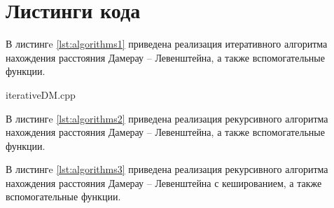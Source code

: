 \section{Листинги кода}

В листингe \ref{lst:algorithms1} приведена реализация итеративного алгоритма нахождения расстояния Дамерау -- Левенштейна, а также вспомогательные функции.

%
\begin{lstinputlisting}[
	caption={Итеративный алгоритм},
	label={lst:algorithms1}
	]{iterativeDM.cpp}
\end{lstinputlisting}

В листингe \ref{lst:algorithms2} приведена реализация рекурсивного алгоритма нахождения расстояния Дамерау -- Левенштейна, а также вспомогательные функции.



В листингe \ref{lst:algorithms3} приведена реализация рекурсивного алгоритма нахождения расстояния Дамерау -- Левенштейна с кешированием, а также вспомогательные функции.
\pagebreak
